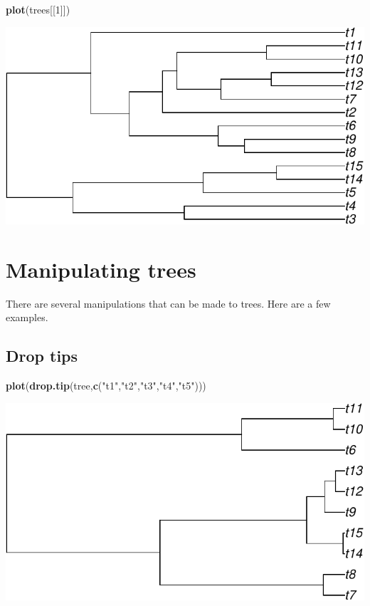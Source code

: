 \documentclass[
]{book}
\newenvironment{Shaded}{\begin{snugshade}}{\end{snugshade}}
\newcommand{\DecValTok}[1]{\textcolor[rgb]{0.00,0.00,0.81}{#1}}
\newcommand{\FunctionTok}[1]{\textcolor[rgb]{0.13,0.29,0.53}{\textbf{#1}}}
\newcommand{\NormalTok}[1]{#1}
\newcommand{\StringTok}[1]{\textcolor[rgb]{0.31,0.60,0.02}{#1}}
\begin{document}
\begin{Shaded}
\begin{Highlighting}[]
\FunctionTok{plot}\NormalTok{(trees[[}\DecValTok{1}\NormalTok{]])}
\end{Highlighting}
\end{Shaded}

\includegraphics{pcm-workshop_files/figure-latex/multiPhylo manipulation-1.pdf}

\section{Manipulating trees}\label{manipulating-trees}

There are several manipulations that can be made to trees. Here are a few examples.

\subsection{Drop tips}\label{drop-tips}

\begin{Shaded}
\begin{Highlighting}[]
\FunctionTok{plot}\NormalTok{(}\FunctionTok{drop.tip}\NormalTok{(tree,}\FunctionTok{c}\NormalTok{(}\StringTok{"t1"}\NormalTok{,}\StringTok{"t2"}\NormalTok{,}\StringTok{"t3"}\NormalTok{,}\StringTok{"t4"}\NormalTok{,}\StringTok{"t5"}\NormalTok{)))}
\end{Highlighting}
\end{Shaded}

\includegraphics{pcm-workshop_files/figure-latex/Drop tips-1.pdf}
\end{document}
